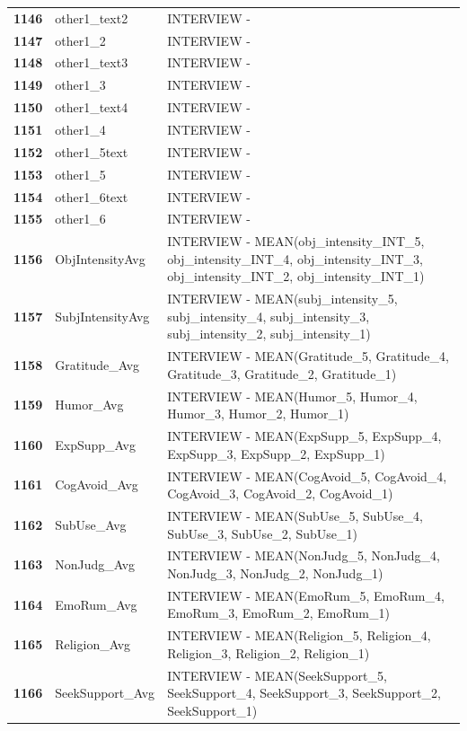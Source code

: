 \documentclass[
  letterpaper,
  DIV=11,
  numbers=noendperiod]{scrartcl}
\begin{document}
\begin{longtable}[t]{>{}cll}
\addlinespace
\textbf{1146} & other1\_text2 & INTERVIEW -\\
\textbf{1147} & other1\_2 & INTERVIEW -\\
\textbf{1148} & other1\_text3 & INTERVIEW -\\
\textbf{1149} & other1\_3 & INTERVIEW -\\
\textbf{1150} & other1\_text4 & INTERVIEW -\\
\addlinespace
\textbf{1151} & other1\_4 & INTERVIEW -\\
\textbf{1152} & other1\_5text & INTERVIEW -\\
\textbf{1153} & other1\_5 & INTERVIEW -\\
\textbf{1154} & other1\_6text & INTERVIEW -\\
\textbf{1155} & other1\_6 & INTERVIEW -\\
\addlinespace
\textbf{1156} & ObjIntensityAvg & INTERVIEW - MEAN(obj\_intensity\_INT\_5, obj\_intensity\_INT\_4, obj\_intensity\_INT\_3, obj\_intensity\_INT\_2, obj\_intensity\_INT\_1)\\
\textbf{1157} & SubjIntensityAvg & INTERVIEW - MEAN(subj\_intensity\_5, subj\_intensity\_4, subj\_intensity\_3, subj\_intensity\_2, subj\_intensity\_1)\\
\textbf{1158} & Gratitude\_Avg & INTERVIEW - MEAN(Gratitude\_5, Gratitude\_4, Gratitude\_3, Gratitude\_2, Gratitude\_1)\\
\textbf{1159} & Humor\_Avg & INTERVIEW - MEAN(Humor\_5, Humor\_4, Humor\_3, Humor\_2, Humor\_1)\\
\textbf{1160} & ExpSupp\_Avg & INTERVIEW - MEAN(ExpSupp\_5, ExpSupp\_4, ExpSupp\_3, ExpSupp\_2, ExpSupp\_1)\\
\addlinespace
\textbf{1161} & CogAvoid\_Avg & INTERVIEW - MEAN(CogAvoid\_5, CogAvoid\_4, CogAvoid\_3, CogAvoid\_2, CogAvoid\_1)\\
\textbf{1162} & SubUse\_Avg & INTERVIEW - MEAN(SubUse\_5, SubUse\_4, SubUse\_3, SubUse\_2, SubUse\_1)\\
\textbf{1163} & NonJudg\_Avg & INTERVIEW - MEAN(NonJudg\_5, NonJudg\_4, NonJudg\_3, NonJudg\_2, NonJudg\_1)\\
\textbf{1164} & EmoRum\_Avg & INTERVIEW - MEAN(EmoRum\_5, EmoRum\_4, EmoRum\_3, EmoRum\_2, EmoRum\_1)\\
\textbf{1165} & Religion\_Avg & INTERVIEW - MEAN(Religion\_5, Religion\_4, Religion\_3, Religion\_2, Religion\_1)\\
\addlinespace
\textbf{1166} & SeekSupport\_Avg & INTERVIEW - MEAN(SeekSupport\_5, SeekSupport\_4, SeekSupport\_3, SeekSupport\_2, SeekSupport\_1)\\

\end{longtable}
\end{document}
